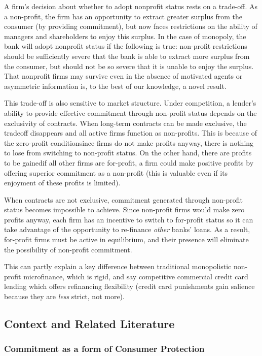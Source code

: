 \documentclass[11pt,english]{article}
\theoremstyle{plain}
\theoremstyle{definition}
\begin{document}
A firm's decision about whether to adopt nonprofit status rests on
a trade-off. As a non-profit, the firm has an opportunity to extract
greater surplus from the consumer (by providing commitment), but now
faces restrictions on the ability of managers and shareholders to
enjoy this surplus. In the case of monopoly, the bank will adopt nonprofit
status if the following is true: non-profit restrictions should be
sufficiently severe that the bank is able to extract more surplus
from the consumer, but should not be so severe that it is unable to
enjoy the surplus. That nonprofit firms may survive even in the absence
of motivated agents or asymmetric information is, to the best of our
knowledge, a novel result.

This trade-off is also sensitive to market structure. Under competition,
a lender's ability to provide effective commitment through non-profit
status depends on the exclusivity of contracts. When long-term contracts
can be made exclusive, the tradeoff disappears and all active firms
function as non-profits. This is because of the zero-profit condition\textendash since
firms do not make profits anyway, there is nothing to lose from switching
to non-profit status. On the other hand, there are profits to be gained\textendash if
all other firms are for-profit, a firm could make positive profits
by offering superior commitment as a non-profit (this is valuable
even if its enjoyment of these profits is limited).

When contracts are not exclusive, commitment generated through non-profit
status becomes impossible to achieve. Since non-profit firms would
make zero profits anyway, each firm has an incentive to switch to
for-profit status so it can take advantage of the opportunity to re-finance
\textit{other} banks' loans. As a result, for-profit firms must be
active in equilibrium, and their presence will eliminate the possibility
of non-profit commitment.

This can partly explain a key difference between traditional monopolistic
non-profit microfinance, which is rigid, and say competitive commercial
credit card lending which offers refinancing flexibility (credit card
punishments gain salience because they are\textit{ less} strict, not
more).

\subsection{Context and Related Literature}

\subsubsection{Commitment as a form of Consumer Protection}
\end{document}
